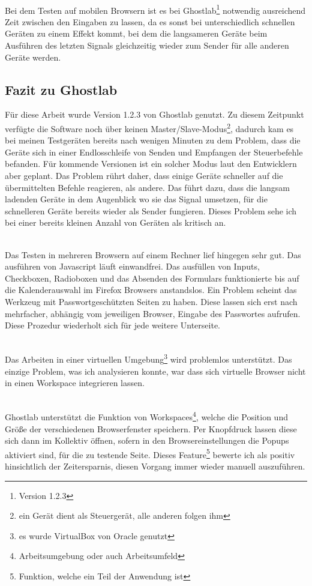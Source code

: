 		\\Bei dem Testen auf mobilen Browsern ist es bei Ghostlab\footnote{Version 1.2.3} notwendig ausreichend Zeit zwischen den Eingaben zu lassen, da es sonst bei unterschiedlich schnellen Geräten zu einem Effekt kommt, bei dem die langsameren Geräte beim Ausführen des letzten Signals gleichzeitig wieder zum Sender für alle anderen Geräte werden.
		
		\pagebreak
		
		\subsection{Fazit zu Ghostlab}
		Für diese Arbeit wurde Version 1.2.3 von Ghostlab genutzt. Zu diesem Zeitpunkt verfügte die Software noch über keinen Master/Slave-Modus\footnote{ein Gerät dient als Steuergerät, alle anderen folgen ihm}, dadurch kam es bei meinen Testgeräten bereits nach wenigen Minuten zu dem Problem, dass die Geräte sich in einer Endlosschleife von Senden und Empfangen der Steuerbefehle befanden. Für kommende Versionen ist ein solcher Modus laut den Entwicklern aber geplant. Das Problem rührt daher, dass einige Geräte schneller auf die übermittelten Befehle reagieren, als andere. Das führt dazu, dass die langsam ladenden Geräte in dem Augenblick wo sie das Signal umsetzen, für die schnelleren Geräte bereits wieder als Sender fungieren. Dieses Problem sehe ich bei einer bereits kleinen Anzahl von Geräten als kritisch an. 

		\\Das Testen in mehreren Browsern auf einem Rechner lief hingegen sehr gut. Das ausführen von Javascript läuft einwandfrei. Das ausfüllen von Inputs, Checkboxen, Radioboxen und das Absenden des Formulars funktionierte bis auf die Kalenderauswahl im Firefox Browsers anstandslos. Ein Problem scheint das Werkzeug mit Passwortgeschützten Seiten zu haben. Diese lassen sich erst nach mehrfacher, abhängig vom jeweiligen Browser, Eingabe des Passwortes aufrufen. Diese Prozedur wiederholt sich für jede weitere Unterseite. 

		\\Das Arbeiten in einer virtuellen Umgebung\footnote{es wurde VirtualBox von Oracle genutzt} wird problemlos unterstützt. Das einzige Problem, was ich analysieren konnte, war dass sich virtuelle Browser nicht in einen Workspace integrieren lassen.

		\\Ghostlab unterstützt die Funktion von Workspaces\footnote{Arbeitsumgebung oder auch Arbeitsumfeld}, welche die Position und Größe der verschiedenen Browserfenster speichern. Per Knopfdruck lassen diese sich dann im Kollektiv öffnen, sofern in den Browsereinstellungen die Popups aktiviert sind, für die zu testende Seite. Dieses Feature\footnote{Funktion, welche ein Teil der Anwendung ist} bewerte ich als positiv hinsichtlich der Zeitersparnis, diesen Vorgang immer wieder manuell auszuführen.

